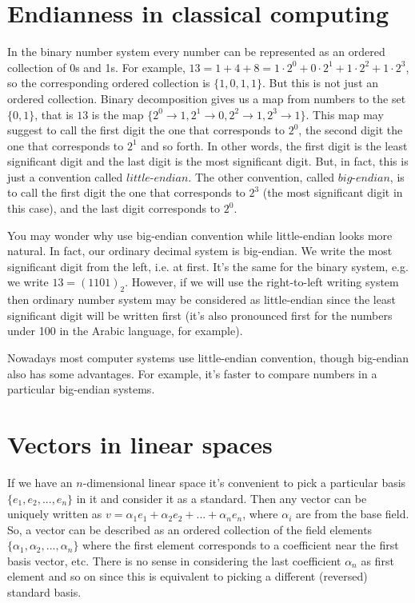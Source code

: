 \documentclass{article}
\begin{document}
\section{Endianness in classical computing}
In the binary number system every number can be represented as an ordered collection of 0s and 1s. 
For example, $13 = 1 + 4 + 8 =  1 \cdot 2^0 + 0 \cdot 2^1 + 1 \cdot 2^2 + 1 \cdot 2^3$, 
so the corresponding ordered collection is $\{1, 0, 1, 1\}$. But this is not just an ordered collection. 
Binary decomposition gives us a map from numbers to the set $\{0,1\}$, 
that is $13$ is the map $\{2^0\rightarrow 1, 2^1\rightarrow0, 2^2\rightarrow1, 2^3\rightarrow1\}$. 
This map may suggest to call the first digit the one that corresponds to $2^0$, 
the second digit the one that corresponds to $2^1$ and so forth. 
In other words, the first digit is the least significant digit and the last digit is the most significant digit. 
But, in fact, this is just a convention called $\textit{little-endian}$. 
The other convention, called $\textit{big-endian}$, is to call the first digit the one that corresponds to $2^3$ (the most significant digit in this case), 
and the last digit corresponds to $2^0$. 

You may wonder why use big-endian convention while little-endian looks more natural. 
In fact, our ordinary decimal system is big-endian. We write the most significant digit from the left, i.e. at first. 
It's the same for the binary system, e.g. we write $13 = (1101)_2$.
However, if we will use the right-to-left writing system then ordinary number system may be considered as little-endian since 
the least significant digit will be written first (it's also pronounced first for the numbers under 100 in the Arabic language, for example).

Nowadays most computer systems use little-endian convention, though big-endian also has some advantages. 
For example, it's faster to compare numbers in a particular big-endian systems. 

\section{Vectors in linear spaces}
If we have an $n$-dimensional linear space it's convenient to pick a particular basis $\{e_1, e_2, ... , e_n\}$ in it and consider it as a standard. 
Then any vector can be uniquely written as $v = \alpha_1 e_1 + \alpha_2 e_2 + ... + \alpha_n e_n$, where $\alpha_i$ are from the base field. 
So, a vector can be described as an ordered collection of the field elements $\{\alpha_1, \alpha_2, ... ,\alpha_n\}$ 
where the first element corresponds to a coefficient near the first basis vector, etc. 
There is no sense in considering the last coefficient $\alpha_n$ as first element and so on since this is equivalent to picking a different (reversed) standard basis. 
\end{document}
